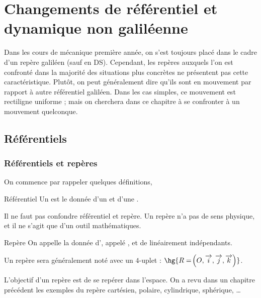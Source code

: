 \documentclass[a4paper,french,bookmarks]{book}
\newcommand{\chaptertoc}[0]{
    \setcounter{tocdepth}{2}
    \begin{tcolorbox}[
        enhanced,
        frame hidden,
        sharp corners,
        detach title,
        spread outwards     = 5pt,
        halign              = center,
        valign              = center,
        borderline west     = {3pt}{0pt}{main20!50!main2!95!gray!90},
        coltitle            = main20!50!main2!95!gray!90, 
        interior style      = {
            left color      = main1white2!65!gray!11,
            middle color    = main1white2!50!gray!10,
            right color     = main1white2!35!gray!9
        },
        arc                 = 0 cm,
        title               = SOMMAIRE,
        boxrule             = 0pt,
        fonttitle           = \bfseries\sffamily,
        overlay             = {
            \node[rotate=90, minimum width=1cm, anchor=south,yshift=-0.8cm]
            at (frame.west) {\tcbtitle};
        }
    ]
        \begin{minipage}{0.83\linewidth}
            \sffamily
            \minitoc
        \end{minipage}
    \end{tcolorbox}
}
\begin{document}
    \chapter{Changements de référentiel et dynamique non galiléenne}
    
    Dans les cours de mécanique première année, on s'est toujours placé dans le cadre d'un repère galiléen (sauf en DS). Cependant, les repères auxquels l'on est confronté dans la majorité des situations plus concrètes ne présentent pas cette caractéristique. Plutôt, on peut généralement dire qu'ils sont en mouvement par rapport à autre référentiel galiléen. Dans les cas simples, ce mouvement est rectiligne uniforme ; mais on cherchera dans ce chapitre à se confronter à un mouvement quelconque.
    
    \chaptertoc
    
    \section{Référentiels}
    
    \subsection{Référentiels et repères}
    
    On commence par rappeler quelques définitions, 
    
    \begin{definition}{Référentiel}{}
        Un  est le donnée d'un  et d'une .
    \end{definition}
    
    Il ne faut pas confondre référentiel et repère. Un repère n'a pas de sens physique, et il ne s'agit que d'un outil mathématiques.
    
    \begin{definition}{Repère}{}
        On appelle  la donnée d', appelé , et de  linéairement indépendants.
    \end{definition}
    
    \begin{notation}
        Un repère  sera généralement noté avec un $4$-uplet : $\hg{R = \p{O, \vec i, \vec j, \vec k}}$.
    \end{notation}
    
    L'objectif d'un repère est de se repérer dans l'espace. On a revu dans un chapitre précédent les exemples du repère cartésien, polaire, cylindrique, sphérique, \dots\newline
    
\end{document}
